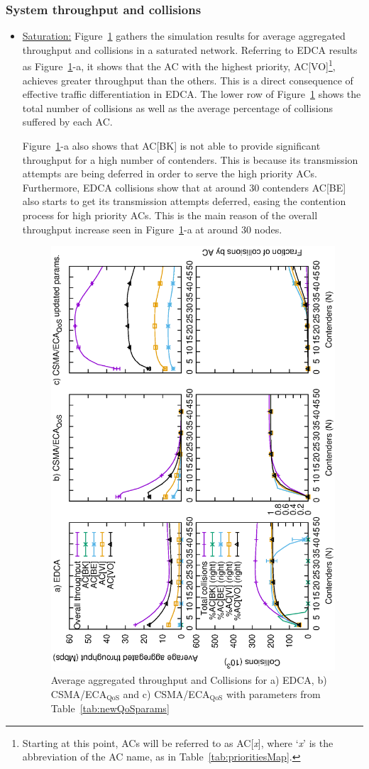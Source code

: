 \subsubsection{System throughput and collisions}
\begin{itemize}
\item\underline{Saturation:} Figure~\ref{fig:multiplotSat} gathers the simulation results for average aggregated throughput and collisions in a saturated network. Referring to EDCA results as Figure~\ref{fig:multiplotSat}-a,  it shows that the AC with the highest priority, AC[VO]\footnote{Starting at this point, ACs will be referred to as AC[\emph{x}], where `\emph{x}' is the abbreviation of the AC name, as in Table~\ref{tab:prioritiesMap}.}, achieves greater throughput than the others. This is a direct consequence of effective traffic differentiation in EDCA. The lower row of Figure~\ref{fig:multiplotSat} shows the total number of collisions as well as the average percentage of collisions suffered by each AC. 

Figure~\ref{fig:multiplotSat}-a also shows that AC[BK] is not able to provide significant throughput for a high number of contenders. This is because its transmission attempts are being deferred in order to serve the high priority ACs. Furthermore, EDCA collisions show that at around 30 contenders AC[BE] also starts to get its transmission attempts deferred, easing the contention process for high priority ACs. This is the main reason of the overall throughput increase seen in Figure~\ref{fig:multiplotSat}-a at around 30 nodes.

\begin{figure}[tb]
	\centering
		\includegraphics[width=0.55\linewidth,angle = -90]{figures/multiplot-sat-perfect.eps}
		\caption{Average aggregated throughput and Collisions for a) EDCA, b) CSMA/ECA$_{\text{QoS}}$ and c) CSMA/ECA$_{\text{QoS}}$ with parameters from Table~\ref{tab:newQoSparams}}
		\label{fig:multiplotSat}
\end{figure}


\end{itemize}
